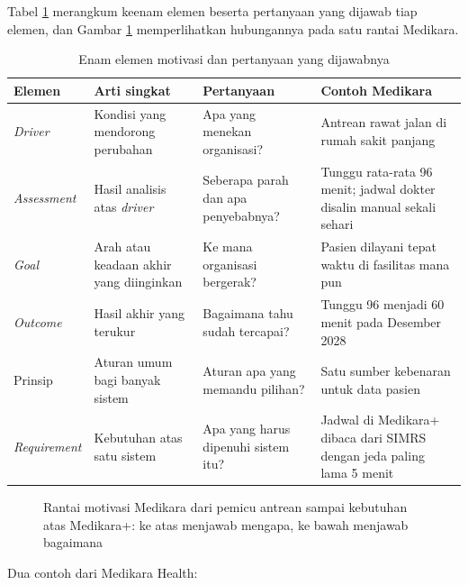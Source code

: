 Tabel \ref{tab:ch03-elemen-motivasi} merangkum keenam elemen beserta pertanyaan
yang dijawab tiap elemen, dan Gambar \ref{fig:ch03-rantai-motivasi}
memperlihatkan hubungannya pada satu rantai Medikara.

\begin{table}[!htb]
  \centering
  \caption{Enam elemen motivasi dan pertanyaan yang dijawabnya}
  \label{tab:ch03-elemen-motivasi}
  \footnotesize
  \begin{tabularx}{\textwidth}{>{\raggedright\arraybackslash}p{1.8cm}*{3}{>{\raggedright\arraybackslash}X}}
    \hline
    \textbf{Elemen} & \textbf{Arti singkat} & \textbf{Pertanyaan} & \textbf{Contoh Medikara} \\
    \hline
    \textit{Driver} & Kondisi yang mendorong perubahan & Apa yang menekan organisasi? & Antrean rawat jalan di rumah sakit panjang \\
    \hline
    \textit{Assessment} & Hasil analisis atas \textit{driver} & Seberapa parah dan apa penyebabnya? & Tunggu rata-rata 96 menit; jadwal dokter disalin manual sekali sehari \\
    \hline
    \textit{Goal} & Arah atau keadaan akhir yang diinginkan & Ke mana organisasi bergerak? & Pasien dilayani tepat waktu di fasilitas mana pun \\
    \hline
    \textit{Outcome} & Hasil akhir yang terukur & Bagaimana tahu sudah tercapai? & Tunggu 96 menjadi 60 menit pada Desember 2028 \\
    \hline
    Prinsip & Aturan umum bagi banyak sistem & Aturan apa yang memandu pilihan? & Satu sumber kebenaran untuk data pasien \\
    \hline
    \textit{Requirement} & Kebutuhan atas satu sistem & Apa yang harus dipenuhi sistem itu? & Jadwal di Medikara+ dibaca dari SIMRS dengan jeda paling lama 5 menit \\
    \hline
  \end{tabularx}
\end{table}

\begin{figure}[!htb]
  \centering
  
  \caption{Rantai motivasi Medikara dari pemicu antrean sampai kebutuhan atas
           Medikara+: ke atas menjawab mengapa, ke bawah menjawab bagaimana}
  \label{fig:ch03-rantai-motivasi}
\end{figure}

Dua contoh dari Medikara Health:


